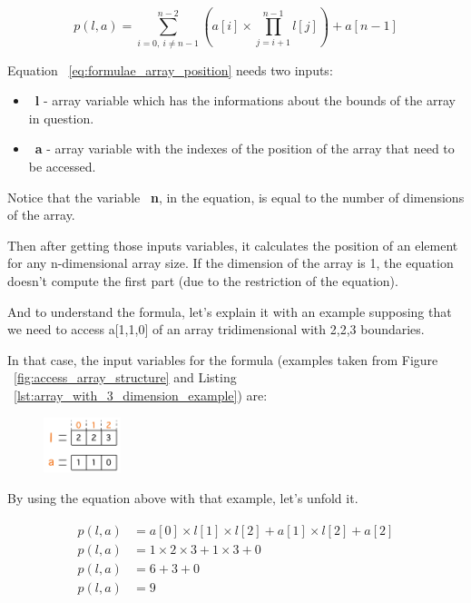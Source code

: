 \documentclass[
  oneside,
  11pt, a4paper,
  footinclude=true,
  headinclude=true,
  cleardoublepage=empty
]{scrbook}
\begin{document}
\begin{equation} \label{eq:formulae_array_position}
  p(l,a) = \sum_{i=0,\ i\neq n-1}^{n-2} (a[i]\times\prod_{j=i+1}^{n-1} l[j])+a[n-1]
\end{equation}

Equation ~\ref{eq:formulae_array_position} needs two inputs:

\begin{itemize}
\item ~\textbf{l} - array variable which has the informations about the bounds of the array in question.
\item ~\textbf{a} - array variable with the indexes of the position of the array that need to be accessed.
\end{itemize}

Notice that the variable ~\textbf{n}, in the equation, is equal to the number of dimensions of the array.

Then after getting those inputs variables, it calculates the position of an element for any n-dimensional  array size.
If the dimension of the array is 1, the equation doesn't compute the first part (due to the restriction of the equation).

And to understand the formula, let's explain it with an example supposing that we need to access a[1,1,0] of an array tridimensional with 2,2,3 boundaries.

In that case, the input variables for the formula (examples taken from Figure ~\ref{fig:access_array_structure} and Listing ~\ref{lst:array_with_3_dimension_example}) are:

\begin{figure}[h!]
  \centering
    \includegraphics[width=0.2\textwidth]{img/example_position_calculation.png}
    \label{fig:example_position_calculation_structure}
\end{figure}

By using the equation above with that example, let's unfold it.

\begin{equation}
 \begin{matrix}
 \begin{aligned}
  p(l,a) &= a[0] \times l[1] \times l[2] + a[1] \times l[2] + a[2] \\
  p(l,a) &= 1 \times 2 \times 3 + 1 \times 3 + 0 \\
  p(l,a) &= 6 + 3 + 0 \\
  p(l,a) &= 9
 \end{aligned}
 \end{matrix}
\end{equation}
\end{document}
